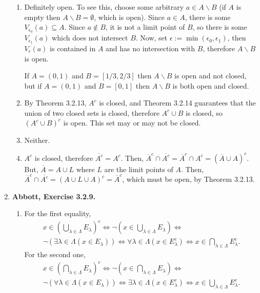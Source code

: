 \documentclass{article}
\newcommand{\exc}[2][Abbott]{\item \textbf{#1, Exercise #2.}}
\begin{document}
\begin{enumerate}
\begin{enumerate}
        \item Definitely open. To see this, choose some arbitrary $a \in A \backslash B$ (if $A$ is empty then $A \backslash B = \emptyset$, which is open). Since $a \in A$, there is some $V_{\epsilon_0}(a) \subseteq A$. Since $a \notin B$, it is not a limit point of $B$, so there is some $V_{\epsilon_1}(a)$ which does not intersect $B$. Now, set $\epsilon := \min (\epsilon_0, \epsilon_1)$, then $V_\epsilon(a)$ is contained in $A$ and has no intersection with $B$, therefore $A\backslash B$ is open.
        
        If $A = (0,1)$ and $B = [1/3, 2/3]$ then $A \backslash B$ is open and not closed, but if $A = (0,1)$ and $B = [0, 1]$ then $A\backslash B$ is both open and closed.
        
        \item By Theorem 3.2.13, $A^c$ is closed, and Theorem 3.2.14 guarantees that the union of two closed sets is closed, therefore $A^c \cup B$ is closed, so $(A^c \cup B)^c$ is open. This set may or may not be closed.
        
        \item Neither.
        
        \item $A^c$ is closed, therefore $\overline{A^c} = A^c$. Then, $\overline{A}^c \cap \overline{A^c} = \overline{A}^c \cap A^c = (\overline{A} \cup A)^c$. But, $\overline{A} = A \cup L$ where $L$ are the limit points of $A$. Then, 
        $\overline{A}^c \cap \overline{A^c} = (A \cup L \cup A)^c = \overline{A}^c$, which must be open, by Theorem 3.2.13.
    \end{enumerate}
    
    \exc{3.2.9}
    \begin{enumerate}
        \item For the first equality, 
        \begin{gather*}
            x \in \left (\bigcup_{\lambda \in \Lambda} E_\lambda \right)^c \iff
             \neg(x \in \bigcup_{\lambda \in \Lambda} E_\lambda) \iff \\
             \neg(\exists \lambda \in \Lambda (x \in E_\lambda)) \iff \forall \lambda \in \Lambda (x \in E_\lambda^c) \iff x \in \bigcap_{\lambda \in \Lambda} E_\lambda^c.
        \end{gather*} For the second one,
        \begin{gather*}
            x \in \left( \bigcap_{\lambda \in \Lambda} E_\lambda \right)^c \iff 
            \neg (x \in \bigcap_{\lambda \in \Lambda} E_\lambda) \iff \\
            \neg(\forall \lambda \in \Lambda (x \in E_\lambda)) \iff 
            \exists \lambda \in \Lambda (x \in E_\lambda^c) \iff 
            x \in \bigcup_{\lambda \in \Lambda} E_\lambda^c.
        \end{gather*}
        

\end{enumerate}
\end{enumerate}
\end{document}

